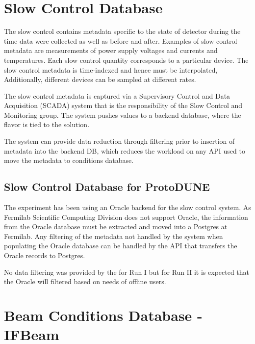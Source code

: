 \documentclass[../main-v1.tex]{subfiles}
\begin{document}
\section{Slow Control Database}
\label{sec:db:slowcontrol}  

The slow control  contains metadata specific to the state of detector during the time data were collected as well as before and after. Examples of slow control metadata are measurements of power supply voltages and currents and temperatures. Each slow control quantity corresponds to a particular device. The slow control  metadata is time-indexed and hence must be interpolated, Additionally, different devices can be sampled at different rates.

The slow control metadata is captured via a Supervisory Control and Data Acquisition (SCADA) system that is the responsibility of the Slow Control and Monitoring group. The   system pushes values to a backend database, where the  flavor is tied to the   solution. 

The   system can provide data reduction through filtering prior to insertion of metadata into the backend DB, which reduces the workload on any API used to move the metadata to conditions database. 

\subsection{Slow Control Database for ProtoDUNE}
\label{sec:slowcontrolPD}

The  experiment has been using an Oracle backend  for the slow control system. As Fermilab Scientific Computing Division does not support Oracle, the information from the Oracle database must be extracted and moved into a Postgres  at Fermilab. Any filtering of the metadata not handled by the   system when populating the Oracle database can be handled by the API that transfers the Oracle records to Postgres.

No data filtering was provided by the   for Run I but for Run II it is expected that the Oracle  will filtered based on needs of offline users.  

\section{Beam Conditions Database - IFBeam}
\label{sec:db:ifbeam}  
\end{document}
